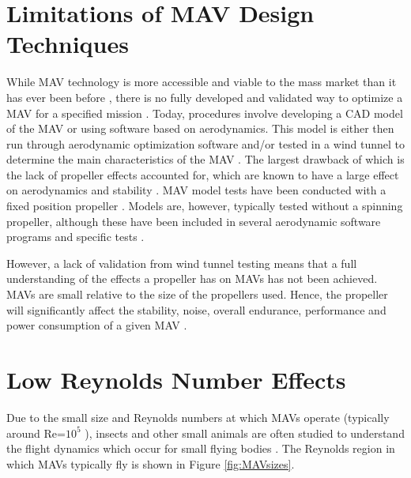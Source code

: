 
\section{Limitations of MAV Design Techniques}
\label{subsec:Limitations}
While MAV technology is more accessible and viable to the mass market than it has ever been before \cite{Jackson2016}, there is no fully developed and validated way to optimize a MAV for a specified mission \cite{Bronz2009, HASSANALIAN2019}. Today, procedures involve developing a CAD model of the MAV or using software based on aerodynamics. This model is either then run through aerodynamic optimization software and/or tested in a wind tunnel to determine the main characteristics of the MAV \cite{Paulson2017}. The largest drawback of which is the lack of propeller effects accounted for, which are known to have a large effect on aerodynamics and stability \cite{Harikumar2021, Chinwicharnam2013}. MAV model tests have been conducted with a fixed position propeller \cite{Shams2020b, Durai2014}. Models are, however, typically tested without a spinning propeller, although these have been included in several aerodynamic software programs and specific tests \cite{Aboelezz2020}. 

However, a lack of validation from wind tunnel testing means that a full understanding of the effects a propeller has on MAVs has not been achieved. MAVs are small relative to the size of the propellers used. Hence, the propeller will significantly affect the stability, noise, overall endurance, performance and power consumption of a given MAV \cite{Shams2020, Chen2022}. 



\section{Low Reynolds Number Effects }

\label{sec:LowReynolds}
Due to the small size and Reynolds numbers at which MAVs operate (typically around Re=$10^5$ \cite{Huq2009} \cite{Winslow2018}), insects and other small animals are often studied to understand the flight dynamics which occur for small flying bodies \cite{Liu2009}. The Reynolds region in which MAVs typically fly is shown in Figure \ref{fig:MAVsizes}.

